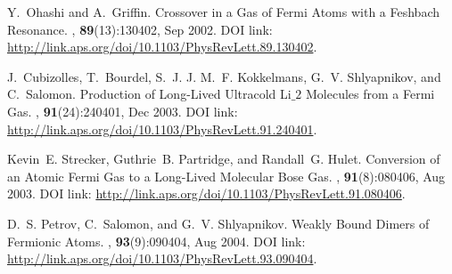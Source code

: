 \documentclass[a4paper,10pt]{article}
\begin{document}
\begin{thebibliography}{10}

Y.~Ohashi and A.~Griffin.
 {C}rossover in a {G}as of {F}ermi {A}toms with a {F}eshbach
  {R}esonance.
, \textbf{89}(13):130402, Sep 2002.
\newblock DOI link: \url{http://link.aps.org/doi/10.1103/PhysRevLett.89.130402}.

J.~Cubizolles, T.~Bourdel, S.~J. J. M.~F. Kokkelmans, G.~V. Shlyapnikov, and
  C.~Salomon.
\newblock Production of {L}ong-{L}ived {U}ltracold {L}i$\_{2}$ {M}olecules from
  a {F}ermi {G}as.
, \textbf{91}(24):240401, Dec 2003.
\newblock DOI link: \url{http://link.aps.org/doi/10.1103/PhysRevLett.91.240401}.


Kevin~E. Strecker, Guthrie~B. Partridge, and Randall~G. Hulet.
\newblock Conversion of an {A}tomic {F}ermi {G}as to a {L}ong-{L}ived
  {M}olecular {B}ose {G}as.
, \textbf{91}(8):080406, Aug 2003.
\newblock DOI link: \url{http://link.aps.org/doi/10.1103/PhysRevLett.91.080406}.

D.~S. Petrov, C.~Salomon, and G.~V. Shlyapnikov.
\newblock Weakly {B}ound {D}imers of {F}ermionic {A}toms.
, \textbf{93}(9):090404, Aug 2004.
\newblock DOI link: \url{http://link.aps.org/doi/10.1103/PhysRevLett.93.090404}.




\end{thebibliography}
\end{document}
